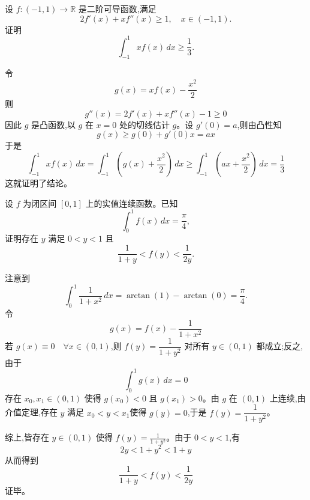 \begin{questions}
    \question 设 $f:(-1,1)\to\mathbb{R}$ 是二阶可导函数,满足
    \[
    2f'(x)+xf''(x)\ge1,\quad x\in(-1,1).
    \]
    证明
    \[
    \int_{-1}^1 x f(x)\,dx \ge \frac{1}{3}.
    \]
    \begin{solution}
        令
        \[
        g(x)=x f(x)-\frac{x^2}{2}
        \]
        则
        \[
        g''(x)=2f'(x)+x f''(x)-1\ge0
        \]
        因此 $g$ 是凸函数,以 $g$ 在 $x=0$ 处的切线估计 $g$。设 $g'(0)=a$,则由凸性知
        \[
        g(x)\ge g(0)+g'(0)x=ax
        \]
        于是
        \[
        \int_{-1}^1 x f(x)\,dx=\int_{-1}^1\left(g(x)+\frac{x^2}{2}\right)\,dx \ge\int_{-1}^1\left(ax+\frac{x^2}{2}\right)\,dx=\frac{1}{3}
        \]
        这就证明了结论。
    \end{solution}

    \question 设 $f$ 为闭区间 $[0,1]$ 上的实值连续函数。已知
    \[
    \int_{0}^{1} f(x)\,dx = \frac{\pi}{4},
    \]
    证明存在 $y$ 满足 $0<y<1$ 且
    \[
    \frac{1}{1+y} < f(y) < \frac{1}{2y}.
    \]
    \begin{solution}
        注意到
        \[
        \int_{0}^{1} \frac{1}{1+x^2}\,dx = \arctan(1) - \arctan(0) = \frac{\pi}{4}.
        \]
        令 
        \[
        g(x) = f(x) - \frac{1}{1+x^2}
        \]
        若 $g(x)\equiv 0 \quad \forall x \in (0,1)$,则 $f(y) = \dfrac{1}{1+y^2}$ 对所有 $y \in (0,1)$ 都成立;反之,由于
        \[
        \int_{0}^{1} g(x)\,dx = 0
        \]
        存在 $x_0, x_1 \in (0,1)$ 使得 $g(x_0) < 0$ 且 $g(x_1) > 0$。由 $g$ 在 $(0,1)$ 上连续,由介值定理,存在 $y$ 满足 $x_0<y<x_1$使得 $g(y)=0$,于是 $f(y) = \dfrac{1}{1+y^2}$。

        综上,皆存在 $y \in (0,1)$ 使得 $f(y) = \frac{1}{1+y^2}$。由于 $0<y<1$,有
        \[
        2y < 1+y^2 < 1+y
        \]
        从而得到
        \[
        \frac{1}{1+y} < f(y) < \frac{1}{2y}
        \]
        证毕。
    \end{solution}


\end{questions}
